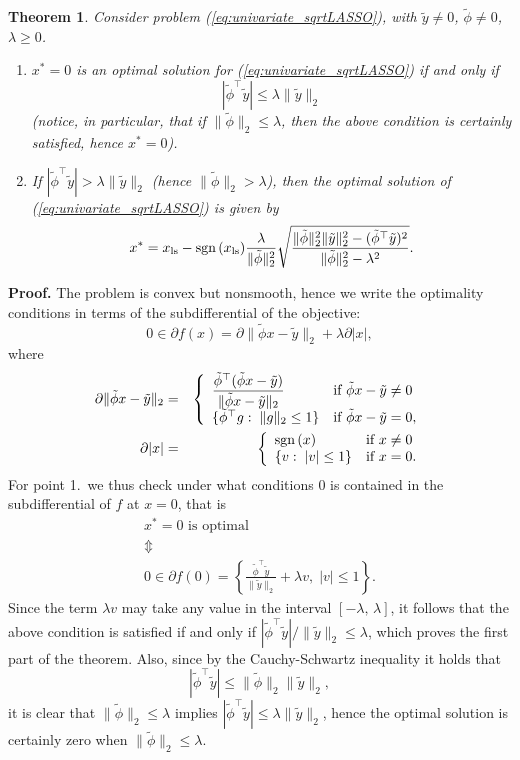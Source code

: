 \documentclass[11pt]{article}
\newcommand{\tran}{^{\top}}
\newcommand{\lam}{\lambda}
\newcommand{\sign}{{\mbox{\rm sgn}\,}}
\newcommand{\beq}{\begin{equation}}
\newcommand{\eeq}{\end{equation}}
\newcommand{\beas}{\begin{eqnarray*}}
\newcommand{\eeas}{\end{eqnarray*}}
\newcommand{\ba}{\begin{array}}
\newcommand{\ea}{\end{array}}
\newcommand{\ben}{\begin{enumerate}}
\newcommand{\een}{\end{enumerate}}
\newcommand{\ped}[1]{{_{\mathrm{#1}}}}
\newtheorem{theorem}{Theorem}
\begin{document}
\begin{theorem} 
\label{prop:univariate_sqrtLASSO}
Consider problem (\ref{eq:univariate_sqrtLASSO}), with $\tilde y\neq 0$, $\tilde \phi\neq 0$, $\lam\geq 0$.
\ben
\item $x^* = 0$ is an optimal solution for (\ref{eq:univariate_sqrtLASSO}) if and only if
\[
|\tilde \phi\tran \tilde y| \leq \lam \|\tilde y\|_2
\]
(notice, in particular, that if $\|\tilde \phi\|_2 \leq \lam$, then the above condition is certainly satisfied, hence $x^*=0$).
\item If $|\tilde \phi\tran \tilde y| > \lam \|\tilde y\|_2$ (hence  $\|\tilde \phi\|_2 > \lam $), then 
the optimal solution of (\ref{eq:univariate_sqrtLASSO}) is given by
\beq
x^* = x\ped{ls} -  \sign (x\ped{ls}) \frac{\lam }{\|\tilde \phi\|_2^2}  \sqrt{\frac{\|\tilde \phi\|_2^2 \|\tilde y\|_2^2 - (\tilde \phi\tran \tilde y)^2}
{\|\tilde \phi\|_2^2- \lam^2}}.
\label{eq:univariate_sqrtLASSO_nzsol}
\eeq
\een
\end{theorem}

\noindent
{\bf Proof.}
The problem is convex but nonsmooth, hence we write the optimality conditions in terms of the subdifferential of the objective:
\[
0\in \partial f(x)  =  \partial \|\tilde \phi x - \tilde y\|_2+ \lam \partial |x|,
\]
where
\beas
\partial  \|\tilde \phi x - \tilde y\|_2 &=& \left\{\displaystyle{ \ba{ll} 
\displaystyle{ \frac{\tilde \phi\tran (\tilde \phi x -  \tilde y)}{\|\tilde \phi x - \tilde y\|_2 }} & \mbox{if } \tilde \phi x - \tilde y\neq 0 \\
\{\tilde \phi\tran g:\; \|g\|_2\leq 1\} &  \mbox{if } \tilde \phi x - \tilde y= 0 ,
\ea}\right. \\
\partial  |x| &=& \left\{\ba{ll} 
\sign(x) & \mbox{if } x \neq 0 \\
\{v:\;  |v| \leq 1\}  & \mbox{if } x= 0.
\ea\right.
\eeas
For point 1.\ we thus check under what conditions $0$ is contained in the subdifferential of $f$ at $x=0$, that is
\[
\begin{array}{c}
x^{*}=0\mbox{ is optimal}\\
\Updownarrow\\
0\in\partial f(0)=\left\{ \frac{\tilde{\phi}\tran\tilde{y}}{\|\tilde{y}\|_{2}}+\lam v,\;|v|\leq1\right\} .
\end{array}
\]
Since  the term $\lam v$ may take any value in the interval $[-\lam,\, \lam]$, it follows that the above condition is satisfied if and only if
${|\tilde \phi\tran \tilde y|}/{\|\tilde y\|_2} \leq \lam$, which proves the first part of the theorem.
Also, since by the Cauchy-Schwartz inequality it holds that
\[
|\tilde \phi\tran \tilde y| \leq \|\tilde \phi\|_2 \|\tilde y\|_2 ,
\]
it is clear that $\|\tilde \phi\|_2\leq \lam$ implies $|\tilde \phi\tran \tilde y| \leq \lam\|\tilde y\|_2 $, hence the optimal solution is certainly zero when $\|\tilde \phi\|_2\leq \lam$.
\end{document}
